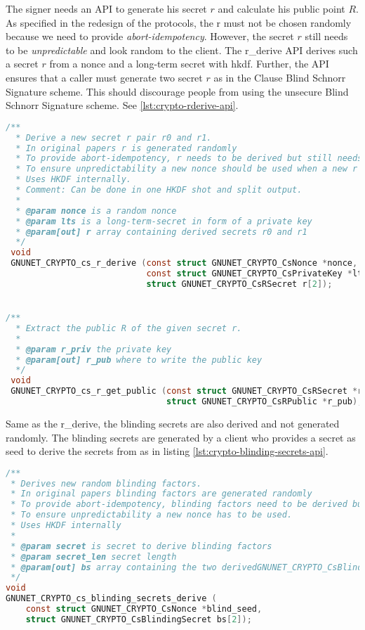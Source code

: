 The signer needs an API to generate his secret $r$ and calculate his public point $R$.
As specified in the redesign of the protocols, the r must not be chosen randomly because we need to provide \textit{\gls{abort-idempotency}}. However, the secret $r$ still needs to be \textit{unpredictable} and look random to the client.
The r\_derive API derives such a secret $r$ from a nonce and a long-term secret with \gls{hkdf}.
Further, the API ensures that a caller must generate two secret $r$ as in the Clause Blind Schnorr Signature scheme. This should discourage people from using the unsecure Blind Schnorr Signature scheme. See \ref{lst:crypto-rderive-api}.


\begin{lstlisting}[style=bfh-c,language=C, caption={GNUnet r derive API}, label={lst:crypto-rderive-api}]
 /**
  * Derive a new secret r pair r0 and r1.
  * In original papers r is generated randomly
  * To provide abort-idempotency, r needs to be derived but still needs to be UNPREDICTABLE
  * To ensure unpredictability a new nonce should be used when a new r needs to be derived.
  * Uses HKDF internally.
  * Comment: Can be done in one HKDF shot and split output.
  *
  * @param nonce is a random nonce
  * @param lts is a long-term-secret in form of a private key
  * @param[out] r array containing derived secrets r0 and r1
  */
 void
 GNUNET_CRYPTO_cs_r_derive (const struct GNUNET_CRYPTO_CsNonce *nonce,
                            const struct GNUNET_CRYPTO_CsPrivateKey *lts,
                            struct GNUNET_CRYPTO_CsRSecret r[2]);


/**
  * Extract the public R of the given secret r.
  *
  * @param r_priv the private key
  * @param[out] r_pub where to write the public key
  */
 void
 GNUNET_CRYPTO_cs_r_get_public (const struct GNUNET_CRYPTO_CsRSecret *r_priv,
                                struct GNUNET_CRYPTO_CsRPublic *r_pub);
\end{lstlisting}


Same as the r\_derive, the blinding secrets are also derived and not generated randomly.
The blinding secrets are generated by a client who provides a secret as seed to derive the secrets from as in listing \ref{lst:crypto-blinding-secrets-api}.

\begin{lstlisting}[style=bfh-c,language=C, caption={GNUnet blinding secrets derive API}, label={lst:crypto-blinding-secrets-api}]
/**
 * Derives new random blinding factors.
 * In original papers blinding factors are generated randomly
 * To provide abort-idempotency, blinding factors need to be derived but still need to be UNPREDICTABLE
 * To ensure unpredictability a new nonce has to be used.
 * Uses HKDF internally
 *
 * @param secret is secret to derive blinding factors
 * @param secret_len secret length
 * @param[out] bs array containing the two derivedGNUNET_CRYPTO_CsBlindingSecret
 */
void
GNUNET_CRYPTO_cs_blinding_secrets_derive (
    const struct GNUNET_CRYPTO_CsNonce *blind_seed,
    struct GNUNET_CRYPTO_CsBlindingSecret bs[2]);
\end{lstlisting}

